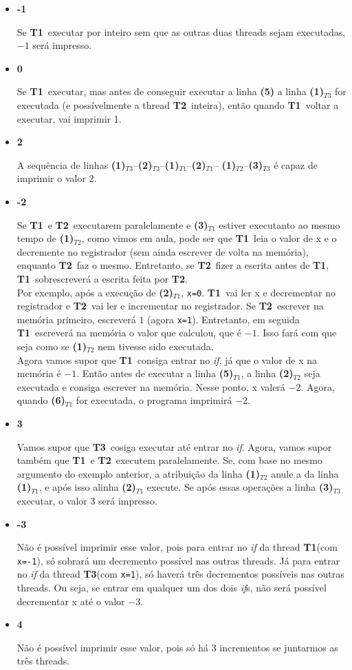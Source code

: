 \documentclass{article}
\newcommand{\Tu}{\textbf{T1}}
\newcommand{\Td}{\textbf{T2}}
\newcommand{\Tt}{\textbf{T3}}
\newcommand{\TL}[2]{\textbf{(#1)}$_{T#2}$}
\begin{document}
\begin{itemize}
	\item \textbf{-1}\par
		Se \Tu\ executar por inteiro sem que as outras duas threads sejam executadas, $-1$ será impresso.
	\item \textbf{0}\par
		Se \Tu\ executar, mas antes de conseguir executar a linha \textbf{(5)} a linha \TL{1}{3}
		for executada (e possívelmente a thread \Td\ inteira), então quando \Tu\ voltar a executar, vai imprimir 1.
	\item \textbf{2}\par
		A sequência de linhas \TL{1}{3}--\TL{2}{3}--\TL{1}{1}--\TL{2}{1}--%
		\TL{1}{2}--\TL{3}{3} é capaz de imprimir o valor 2.
		\pagebreak
	\item \textbf{-2}\par
		Se \Tu\ e \Td\ executarem paralelamente e \TL{3}{1} estiver executanto ao mesmo tempo de \TL{1}{2},
		como vimos em aula, pode ser que \Tu\ leia o valor de x e o decremente no registrador (sem ainda escrever
		de volta na memória), enquanto \Td\ faz o mesmo. Entretanto, se \Td\ fizer a escrita antes de \Tu, \Tu\
		sobrescreverá a escrita feita por \Td.\\
		Por exemplo, após a execução de \TL{2}{1}, \texttt{x=0}. \Tu\ vai ler x e decrementar no registrador e
		\Td\ vai ler e incrementar no registrador. Se \Td\ escrever na memória primeiro, escreverá $1$ (agora \texttt{x=1}).
		Entretanto, em seguida \Tu\ escreverá na memória o valor que calculou, que é $-1$. Isso fará com que seja como se
		\TL{1}{2} nem tivesse sido executada.\\
		Agora vamos supor que \Tu\ consiga entrar no \emph{if}, já que o valor de x na memória é $-1$. Então antes de executar
		a linha \TL{5}{1}, a linha \TL{2}{2} seja executada e consiga escrever na memória. Nesse ponto, x valerá $-2$. Agora,
		quando \TL{6}{1} for executada, o programa imprimirá $-2$.
	\item \textbf{3}\par
		Vamos supor que \Tt\ cosiga executar até entrar no \emph{if}. Agora, vamos supor também que \Tu\ e \Td\ executem
		paralelamente. Se, com base no mesmo argumento do exemplo anterior, a atribuição da linha \TL{1}{2} anule a da linha
		\TL{1}{1}, e após isso alinha \TL{2}{1} execute. Se após essas operações a linha \TL{3}{3} executar, o valor 3 será
		impresso.
	\item \textbf{-3}\par
		Não é possível imprimir esse valor, pois para entrar no \emph{if} da thread \Tu (com \texttt{x=-1}), só sobrará um
		decremento possível nas outras threads. Já para entrar no \emph{if} da thread \Tt (com \texttt{x=1}), só haverá três
		decrementos possíveis nas outras threads. Ou seja, se entrar em qualquer um dos dois \emph{if}s, não será possível
		decrementar x até o valor $-3$.
	\item \textbf{4}\par
		Não é possível imprimir esse valor, pois só há 3 incrementos se juntarmos as três threads.
\end{itemize}
\end{document}
